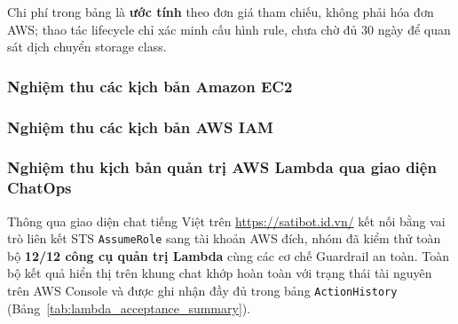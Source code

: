 \documentclass[a4paper,12pt]{article}
\newcommand{\code}[1]{\texttt{#1}}
\begin{document}
Chi phí trong bảng là \textbf{ước tính}
theo đơn giá tham chiếu, không phải hóa đơn AWS; thao tác lifecycle chỉ xác
minh cấu hình rule, chưa chờ đủ 30 ngày để quan sát dịch chuyển storage class.

\subsubsection{Nghiệm thu các kịch bản Amazon EC2}

\subsubsection{Nghiệm thu các kịch bản AWS IAM}

\subsubsection{Nghiệm thu kịch bản quản trị AWS Lambda qua giao diện ChatOps}

Thông qua giao diện chat tiếng Việt trên \url{https://satibot.id.vn/} kết nối bằng vai trò liên kết STS \code{AssumeRole} sang tài khoản AWS đích, nhóm đã kiểm thử toàn bộ \textbf{12/12 công cụ quản trị Lambda} cùng các cơ chế Guardrail an toàn. Toàn bộ kết quả hiển thị trên khung chat khớp hoàn toàn với trạng thái tài nguyên trên AWS Console và được ghi nhận đầy đủ trong bảng \code{ActionHistory} (Bảng~\ref{tab:lambda_acceptance_summary}).
\end{document}
